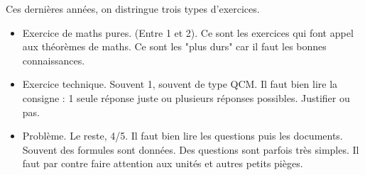 \documentclass[11pt]{article}
\begin{document}
Ces dernières années, on distringue trois types d'exercices.
\begin{itemize}
\item Exercice de maths pures. (Entre 1 et 2). Ce sont les exercices qui font appel aux théorèmes de maths. Ce sont les "plus durs" car il faut les bonnes connaissances.
\item Exercice technique. Souvent 1, souvent de type QCM. Il faut bien lire la consigne : 1 seule réponse juste ou plusieurs réponses possibles. Justifier ou pas. 
\item Problème. Le reste, 4/5. Il faut bien lire les questions puis les documents. Souvent des formules sont données. Des questions sont parfois très simples. Il faut par contre faire attention aux unités et autres petits pièges.                                                                                          
\end{itemize}
\end{document}
